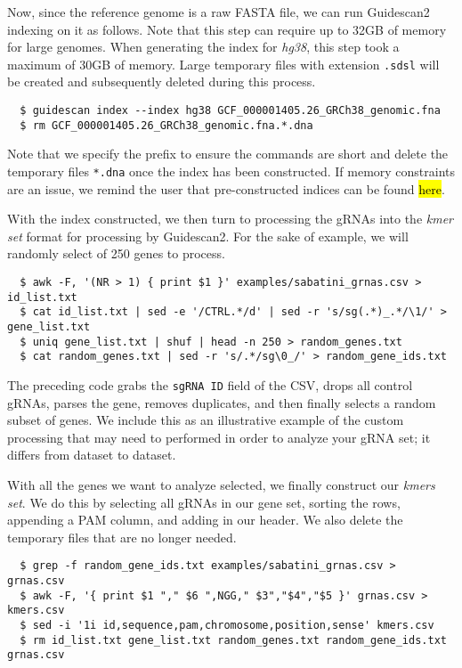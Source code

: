 \documentclass[11pt]{article}
\begin{document}
Now, since the reference genome is a raw FASTA file, we can run
Guidescan2 indexing on it as follows. Note that this step can require
up to 32GB of memory for large genomes. When generating the index for
\textit{hg38}, this step took a maximum of 30GB of memory. Large
temporary files with extension \texttt{.sdsl} will be created and
subsequently deleted during this process.

\begin{verbatim}
  $ guidescan index --index hg38 GCF_000001405.26_GRCh38_genomic.fna
  $ rm GCF_000001405.26_GRCh38_genomic.fna.*.dna
\end{verbatim}

Note that we specify the prefix to ensure the commands are short and
delete the temporary files \texttt{*.dna} once the index has been
constructed. If memory constraints are an issue, we remind the user
that pre-constructed indices can be found \hl{here}.

With the index constructed, we then turn to processing the gRNAs into
the {\it kmer set} format for processing by Guidescan2. For the sake
of example, we will randomly select of 250 genes to process.

\begin{verbatim}
  $ awk -F, '(NR > 1) { print $1 }' examples/sabatini_grnas.csv > id_list.txt
  $ cat id_list.txt | sed -e '/CTRL.*/d' | sed -r 's/sg(.*)_.*/\1/' > gene_list.txt
  $ uniq gene_list.txt | shuf | head -n 250 > random_genes.txt
  $ cat random_genes.txt | sed -r 's/.*/sg\0_/' > random_gene_ids.txt
\end{verbatim}

The preceding code grabs the \texttt{sgRNA ID} field of the CSV, drops
all control gRNAs, parses the gene, removes duplicates, and then
finally selects a random subset of genes. We include this as an
illustrative example of the custom processing that may need to
performed in order to analyze your gRNA set; it differs from dataset
to dataset.

With all the genes we want to analyze selected, we finally construct
our {\it kmers set}. We do this by selecting all gRNAs in our gene
set, sorting the rows, appending a PAM column, and adding in
our header. We also delete the temporary files that are no longer
needed.

\begin{verbatim}
  $ grep -f random_gene_ids.txt examples/sabatini_grnas.csv > grnas.csv
  $ awk -F, '{ print $1 "," $6 ",NGG," $3","$4","$5 }' grnas.csv > kmers.csv
  $ sed -i '1i id,sequence,pam,chromosome,position,sense' kmers.csv
  $ rm id_list.txt gene_list.txt random_genes.txt random_gene_ids.txt grnas.csv
\end{verbatim}
\end{document}
